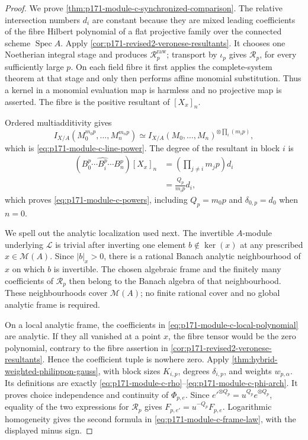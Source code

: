 \begin{proof}
We prove \cref{thm:p171-module-c-synchronized-comparison}.  The relative
intersection numbers \(d_i\) are constant because they are mixed leading
coefficients of the fibre Hilbert polynomial of a flat projective family
over the connected scheme \(\operatorname{Spec}A\).  Apply
\cref{cor:p171-revised2-veronese-resultants}.  It chooses one Noetherian
integral stage and produces \(\mathcal R_p^{\mathrm{raw}}\); transport by
\(\iota_p\) gives \(\mathcal R_p\), for every sufficiently large \(p\).
On each field fibre it first applies the complete-system theorem
at that stage and only then performs affine monomial substitution.  Thus a
kernel in a monomial evaluation map is harmless and no projective map is
asserted.  The fibre is the positive resultant of \([X_x]_n\).

Ordered multiadditivity gives
\[
 I_{X/A}(M_0^{m_0p},\ldots,M_n^{m_np})
 \simeq I_{X/A}(M_0,\ldots,M_n)^{\otimes\prod_i(m_ip)},
\]
which is \eqref{eq:p171-module-c-line-power}.  The degree of the resultant
in block \(i\) is
\begin{align*}
 (B_0^p\cdots\widehat{B_i^p}\cdots B_n^p)[X_x]_n
 &=\left(\prod_{j\ne i}m_jp\right)d_i\\
 &=\frac{Q_p}{m_ip}d_i,
\end{align*}
which proves \eqref{eq:p171-module-c-powers}, including
\(Q_p=m_0p\) and \(\delta_{0,p}=d_0\) when \(n=0\).

We spell out the analytic localization used next.  The invertible
\(A\)-module underlying \(\mathscr L\) is trivial after inverting one
element \(b\notin\ker(x)\) at any prescribed
\(x\in\mathcal M(A)\).  Since \(\lvert b\rvert_x>0\), there is a rational
Banach analytic neighbourhood of \(x\) on which \(b\) is invertible.  The
chosen algebraic frame and the finitely many coefficients of
\(\mathcal R_p\) then belong to the Banach algebra of that neighbourhood.
These neighbourhoods cover \(\mathcal M(A)\); no finite rational cover and
no global analytic frame is required.

On a local analytic frame, the coefficients in
\eqref{eq:p171-module-c-local-polynomial} are analytic.  If they all
vanished at a point \(x\), the fibre tensor would be the zero polynomial,
contrary to the fibre assertion in
\cref{cor:p171-revised2-veronese-resultants}.  Hence the coefficient tuple
is nowhere zero.  Apply
\cref{thm:hybrid-weighted-philippon-gauss}, with block sizes
\(K_{i,p}\), degrees \(\delta_{i,p}\), and weights
\(w_{p,\alpha}\).  Its definitions are exactly
\eqref{eq:p171-module-c-rho}--\eqref{eq:p171-module-c-phi-arch}.  It proves
choice independence and continuity of \(\Phi_{p,e}\).  Since
\(e'^{\otimes Q_p}=u^{Q_p}e^{\otimes Q_p}\), equality of the two
expressions for \(\mathcal R_p\) gives
\(F_{p,e'}=u^{-Q_p}F_{p,e}\).  Logarithmic homogeneity gives the second
formula in \eqref{eq:p171-module-c-frame-law}, with the displayed minus
sign.


\end{proof}
